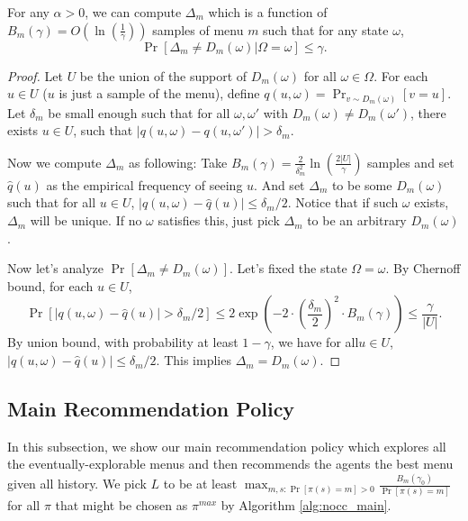\begin{lemma}
\label{lem:deltam}
For any $\alpha > 0$, we can compute $\Delta_m$ which is a function of $B_m(\gamma) = O\left(\ln\left(\frac{1}{\gamma}\right)\right)$ samples of menu $m$ such that for any state $\omega$, 
\[
\Pr[\Delta_m \neq D_m(\omega) | \Omega = \omega] \leq \gamma.
\]
\end{lemma}

\begin{proof}
Let $U$ be the union of the support of $D_m(\omega)$ for all $\omega \in \varOmega$. For each $u \in U$ ($u$ is just a sample of the menu), define $q(u,\omega) = \Pr_{v \sim D_m(\omega)}[v = u]$. Let $\delta_m$ be small enough such that for all $\omega, \omega'$ with $D_m(\omega) \neq D_m(\omega')$, there exists $u \in U$, such that $|q(u,\omega) - q(u,\omega')| > \delta_m$. 

Now we compute $\Delta_m$ as following: Take $B_m(\gamma) = \frac{2}{\delta_m^2}\ln\left(\frac{2|U|}{\gamma}\right) $ samples and set $\hat{q}(u)$ as the empirical frequency of seeing $u$. And set $\Delta_m$ to be some $D_m(\omega)$ such that for all $u \in U$, $|q(u,\omega) - \hat{q}(u)| \leq \delta_m / 2$. Notice that if such $\omega$ exists, $\Delta_m$ will be unique. If no $\omega$ satisfies this, just pick $\Delta_m$ to be an arbitrary $D_m(\omega)$. 

Now let's analyze $\Pr[\Delta_m \neq D_m(\omega)]$. Let's fixed the state $\Omega = \omega$. By Chernoff bound, for each $u \in U$, 
\[
\Pr[|q(u,\omega) -\hat{q}(u)| > \delta_m/2] \leq 2\exp\left(-2 \cdot \left(\frac{\delta_m}{2}\right)^2 \cdot B_m(\gamma)\right) \leq \frac{\gamma}{|U|}.
\]
By union bound, with probability at least $1-\gamma$, we have for all$u \in U$, $|q(u,\omega) - \hat{q}(u)| \leq \delta_m / 2$. This implies $\Delta_m = D_m(\omega)$. 
\end{proof}

\subsection{Main Recommendation Policy}
\label{sec:private_main}
In this subsection, we show our main recommendation policy which explores all the eventually-explorable menus and then recommends the agents the best menu given all history. We pick $L$ to be at least $\max_{m,s:\Pr[\pi(s)=m] >0} \frac{B_m(\gamma_0)}{ \Pr[\pi(s)=m]}$ for all $\pi$ that might be chosen as $\pi^{max}$ by Algorithm \ref{alg:nocc_main}.

